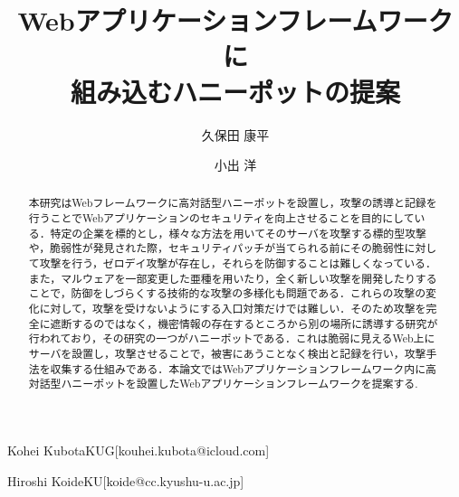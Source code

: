 \documentclass{css}
\begin{document}

\title{Webアプリケーションフレームワークに\\組み込むハニーポットの提案}



\author{久保田 康平}{Kohei Kubota}{KUG}[kouhei.kubota@icloud.com]
\author{小出 洋}{Hiroshi Koide}{KU}[koide@cc.kyushu-u.ac.jp]



\begin{abstract}
本研究はWebフレームワークに高対話型ハニーポットを設置し，攻撃の誘導と記録を行うことでWebアプリケーションのセキュリティを向上させることを目的にしている．特定の企業を標的とし，様々な方法を用いてそのサーバを攻撃する標的型攻撃や，脆弱性が発見された際，セキュリティパッチが当てられる前にその脆弱性に対して攻撃を行う，ゼロデイ攻撃が存在し，それらを防御することは難しくなっている．また，マルウェアを一部変更した亜種を用いたり，全く新しい攻撃を開発したりすることで，防御をしづらくする技術的な攻撃の多様化も問題である．これらの攻撃の変化に対して，攻撃を受けないようにする入口対策だけでは難しい．そのため攻撃を完全に遮断するのではなく，機密情報の存在するところから別の場所に誘導する研究が行われており，その研究の一つがハニーポットである．これは脆弱に見えるWeb上にサーバを設置し，攻撃させることで，被害にあうことなく検出と記録を行い，攻撃手法を収集する仕組みである．本論文ではWebアプリケーションフレームワーク内に高対話型ハニーポットを設置したWebアプリケーションフレームワークを提案する.
\end{abstract}
\end{document}
